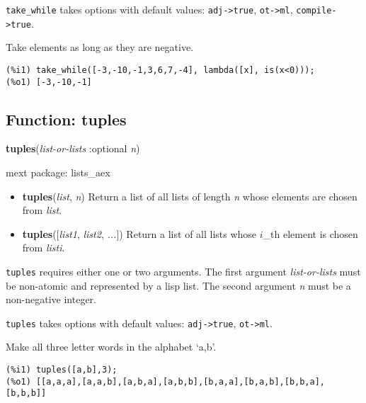 \documentclass[]{article}
\begin{document}
\vspace{5 pt}

{\tt take\_while} takes options with default values: {\tt adj->true}, {\tt ot->ml}, {\tt compile->true}.
\vspace{5 pt}


   Take elements as long as they are negative. 

\begin{Verbatim}[frame=single]
(%i1) take_while([-3,-10,-1,3,6,7,-4], lambda([x], is(x<0)));
(%o1) [-3,-10,-1]
\end{Verbatim}


\subsection{Function: tuples\label{sec:tuples}}
\hypertarget{tuples}{}
{\bf tuples}({\it list-or-lists} :optional {\it n})


\noindent mext package: lists\_aex



\vspace{5 pt}
\begin{itemize}
\item[] {\bf tuples}({\it list}, {\it n})
  Return a list of all lists of length {\it n} whose elements are chosen from {\it list}. 

\item[] {\bf tuples}([{\it list1}, {\it list2}, {\it ...}])
  Return a list of all lists whose $i$\_th element is chosen from {\it listi}. 

\end{itemize}
   {\tt tuples} requires either one or two arguments.
    The first argument {\it list-or-lists} must be non-atomic and represented by a lisp list.
    The second argument {\it n} must be a non-negative integer.


\vspace{5 pt}

{\tt tuples} takes options with default values: {\tt adj->true}, {\tt ot->ml}.
\vspace{5 pt}


   Make all three letter words in the alphabet `a,b'. 

\begin{Verbatim}[frame=single]
(%i1) tuples([a,b],3);
(%o1) [[a,a,a],[a,a,b],[a,b,a],[a,b,b],[b,a,a],[b,a,b],[b,b,a],[b,b,b]]
\end{Verbatim}
\end{document}
